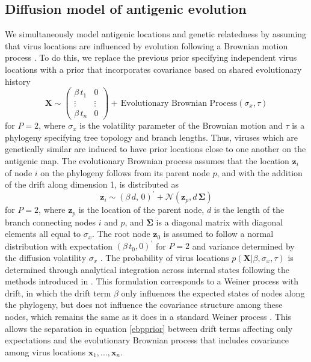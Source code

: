 \documentclass[11pt,oneside,letterpaper]{article}
\newcommand{\virus}{\mathbf{x}}						%
\newcommand{\viruses}{\mathbf{X}}					%
\newcommand{\virussd}{\sigma_x}						%
\newcommand{\tree}{\tau}							%
\newcommand{\node}{\mathbf{z}}						%
\newcommand{\normal}{\mathcal{N}}					%
\begin{document}
\subsection*{Diffusion model of antigenic evolution}

We simultaneously model antigenic locations and genetic relatedness by assuming that virus locations are influenced by evolution following a Brownian motion process \cite{Lemey10}.
To do this, we replace the previous prior specifying independent virus locations with a prior that incorporates covariance based on shared evolutionary history
\begin{equation} \label{ebpprior}
	\viruses \sim \left( \begin{matrix} \beta \, t_1 & 0 \\ \vdots & \vdots \\ \beta \, t_n & 0 \end{matrix} \right) + \, \mbox{Evolutionary Brownian Process}(\virussd, \tree)
\end{equation}
for $P=2$, where $\virussd$ is the volatility parameter of the Brownian motion and $\tree$ is a phylogeny specifying tree topology and branch lengths.
Thus, viruses which are genetically similar are induced to have prior locations close to one another on the antigenic map.
The evolutionary Brownian process assumes that the location $\node_i$ of node $i$ on the phylogeny follows from its parent node $p$, and with the addition of the drift along dimension 1, is distributed as
\begin{equation} 
	\node_i \sim (\beta \, d, \, 0)^{\prime} + \normal(\node_p, d \, \boldsymbol{\Sigma})
\end{equation}
for $P=2$, where $\node_p$ is the location of the parent node, $d$ is the length of the branch connecting nodes $i$ and $p$, and $\boldsymbol{\Sigma}$ is a diagonal matrix with diagonal elements all equal to $\virussd$.
The root node $\node_0$ is assumed to follow a normal distribution with expectation $(\beta \, t_0, 0)^{\prime}$ for $P=2$ and variance determined by the diffusion volatility $\virussd$ \cite{Lemey10}.
The probability of virus locations $p(\viruses | \beta, \virussd, \tree)$ is determined through analytical integration across internal states following the methods introduced in \cite{Lemey10}.
This formulation corresponds to a Weiner process with drift, in which the drift term $\beta$ only influences the expected states of nodes along the phylogeny, but does not influence the covariance structure among these nodes, which remains the same as it does in a standard Weiner process \cite{BrownianMotionHandbook}.
This allows the separation in equation \ref{ebpprior} between drift terms affecting only expectations and the evolutionary Brownian process that includes covariance among virus locations $\virus_1,\ldots,\virus_n$.
\end{document}
